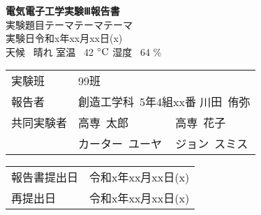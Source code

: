 \begin{titlepage}
    \begin{center}
        \vspace*{40truept}
        {   
            \Large \textbf{電気電子工学実験Ⅲ報告書}
        } \\ %
        
        \vspace{30truept}
        {
            \large 実験題目\quad テーマテーマテーマ
        } \\
        \vspace{60truept}
        { 実験日\quad 令和x年xx月xx日(x)} \\
        \vspace{10truept}
        {   
            天候 \ 晴れ
            \hspace{6truept} 室温 \ 42 $^\circ \rm{C}$
            \hspace{6truept} 湿度 \ 64 \%
        } \\

        \vspace{280truept}

        \begin{tabular}{>{\centering}p{5cm} p{30mm} p{70mm}}
            実験班   & 99班 & ~\\
            報告者   & \multicolumn{2}{l}{創造工学科\ 5年4組xx番 川田~侑弥} \\
            共同実験者   & 高専~太郎 & 高専~花子  \\
                        & カーター~ユーヤ & ジョン~スミス \\
        \end{tabular}

        \vfill

        \begin{tabular}{p{30mm} p{40mm}}
            報告書提出日 & 令和x年xx月xx日(x) \\
            再提出日   & 令和x年xx月xx日(x)
        \end{tabular}
    \end{center}
\end{titlepage}

\newpage